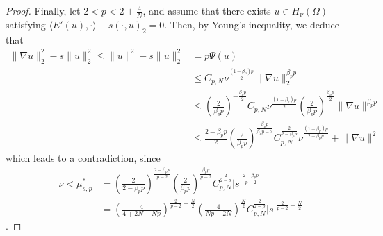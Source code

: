 \documentclass[11pt]{amsart}
\newcommand{\abs}[1]{\lvert#1\rvert}
\newcommand{\norm}[1]{\lVert#1\rVert}
\numberwithin{equation}{section}
\begin{document}
\begin{proof}
Finally, let $2<p<2+\frac{4}{N}$, and assume that there exists $u \in H_\nu(\Omega)$ satisfying $\langle E'(u),\cdot \rangle-s(\cdot,u)_2 = 0$. Then, by Young's inequality, we deduce that
$$
\begin{aligned}
    \norm{\nabla u}_2^2 -s\norm{u}_2^2\leq \norm{u}^2 -s\norm{u}_2^2 &= p\Psi(u) \\
    &\leq C_{p,N}\nu^{\frac{(1-\beta_p)p}{2}}\norm{\nabla u}_2^{\beta_pp} \\
    &\leq \left(\frac{2}{{\beta_pp}}\right)^{-\frac{{\beta_pp}}{2}}C_{p,N}\nu^{\frac{(1-\beta_p)p}{2}}\left(\frac{2}{{\beta_pp}}\right)^\frac{{\beta_pp}}{2}\norm{\nabla u}^{\beta_pp} \\
    &\leq \frac{2-\beta_pp}{2}\left(\frac{2}{\beta_pp}\right)^\frac{\beta_pp}{\beta_pp-2}C_{p,N}^\frac{2}{2-\beta_pp}\nu^\frac{(1-\beta_p)p}{2-\beta_pp}+\norm{\nabla u}^2
\end{aligned}
$$
which leads to a contradiction, since
$$\begin{aligned}
    \nu < \mu_{s,p}^*&=\left(\frac{2}{2-\beta_pp}\right)^\frac{2-\beta_pp}{p-2}\left(\frac{2}{\beta_pp}\right)^\frac{\beta_pp}{p-2}C_{p,N}^{\frac{2}{2-p}}\abs{s}^{\frac{2-\beta_pp}{p-2}}\\
    &=\left(\frac{4}{4+2N-Np}\right)^{\frac{2}{p-2}-\frac{N}{2}}\left(\frac{4}{Np-2N}\right)^\frac{N}{2}C_{p,N}^{\frac{2}{2-p}}\abs{s}^{\frac{2}{p-2}-\frac{N}{2}}
\end{aligned}$$.
\end{proof}
\fi
\end{document}
